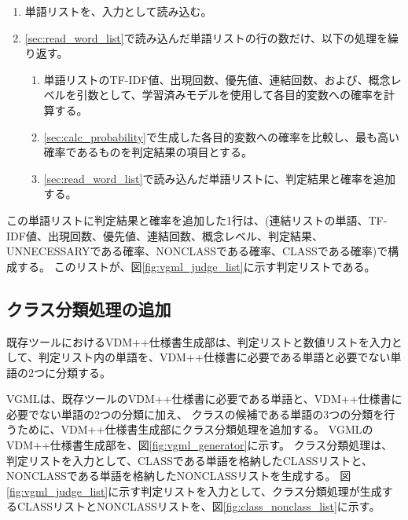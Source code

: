\begin{enumerate}
    \item 単語リストを、入力として読み込む。
    \label{sec:read_word_list}
    \item \ref{sec:read_word_list}で読み込んだ単語リストの行の数だけ、以下の処理を繰り返す。
        \begin{enumerate}
            \item 単語リストのTF-IDF値、出現回数、優先値、連結回数、および、概念レベルを引数として、学習済みモデルを使用して各目的変数への確率を計算する。
            \label{sec:calc_probability}
            \item \ref{sec:calc_probability}で生成した各目的変数への確率を比較し、最も高い確率であるものを判定結果の項目とする。
            \item \ref{sec:read_word_list}で読み込んだ単語リストに、判定結果と確率を追加する。
        \end{enumerate}
\end{enumerate}

この単語リストに判定結果と確率を追加した1行は、(連結リストの単語、TF-IDF値、出現回数、優先値、連結回数、概念レベル、判定結果、UNNECESSARYである確率、NONCLASSである確率、CLASSである確率)で構成する。
このリストが、図\ref{fig:vgml_judge_list}に示す判定リストである。

\subsection{クラス分類処理の追加}
\label{sec:classifier_class}
既存ツールにおけるVDM++仕様書生成部は、判定リストと数値リストを入力として、判定リスト内の単語を、VDM++仕様書に必要である単語と必要でない単語の2つに分類する。

VGMLは、既存ツールのVDM++仕様書に必要である単語と、VDM++仕様書に必要でない単語の2つの分類に加え、
クラスの候補である単語の3つの分類を行うために、VDM++仕様書生成部にクラス分類処理を追加する。
VGMLのVDM++仕様書生成部を、図\ref{fig:vgml_generator}に示す。
クラス分類処理は、判定リストを入力として、CLASSである単語を格納したCLASSリストと、NONCLASSである単語を格納したNONCLASSリストを生成する。
図\ref{fig:vgml_judge_list}に示す判定リストを入力として、クラス分類処理が生成するCLASSリストとNONCLASSリストを、図\ref{fig:class_nonclass_list}に示す。

